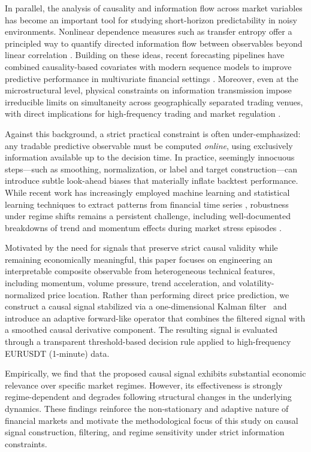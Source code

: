 \documentclass[final,5p,times,twocolumn]{elsarticle}
\begin{document}
In parallel, the analysis of causality and information flow across market variables has become an important tool for studying short-horizon predictability in noisy environments.
Nonlinear dependence measures such as transfer entropy offer a principled way to quantify directed information flow between observables beyond linear correlation \cite{schreiber2000,marschinski2002}.
Building on these ideas, recent forecasting pipelines have combined causality-based covariates with modern sequence models to improve predictive performance in multivariate financial settings \cite{berenguer2024}.
Moreover, even at the microstructural level, physical constraints on information transmission impose irreducible limits on simultaneity across geographically separated trading venues, with direct implications for high-frequency trading and market regulation \cite{Angel2014physicsAndFinancial}.

Against this background, a strict practical constraint is often under-emphasized: any tradable predictive observable must be computed \emph{online}, using exclusively information available up to the decision time.
In practice, seemingly innocuous steps—such as smoothing, normalization, or label and target construction—can introduce subtle look-ahead biases that materially inflate backtest performance.
While recent work has increasingly employed machine learning and statistical learning techniques to extract patterns from financial time series
\cite{zahedi2015,rounaghi2015,roostaee2023,wood2024},
robustness under regime shifts remains a persistent challenge, including well-documented breakdowns of trend and momentum effects during market stress episodes \cite{daniel2016}.

Motivated by the need for signals that preserve strict causal validity while remaining economically meaningful, this paper focuses on engineering an interpretable composite observable from heterogeneous technical features, including momentum, volume pressure, trend acceleration, and volatility-normalized price location.
Rather than performing direct price prediction, we construct a causal signal stabilized via a one-dimensional Kalman filter~\cite{kalman1960} and introduce an adaptive forward-like operator that combines the filtered signal with a smoothed causal derivative component.
The resulting signal is evaluated through a transparent threshold-based decision rule applied to high-frequency EURUSDT (1-minute) data.

Empirically, we find that the proposed causal signal exhibits substantial economic relevance over specific market regimes.
However, its effectiveness is strongly regime-dependent and degrades following structural changes in the underlying dynamics.
These findings reinforce the non-stationary and adaptive nature of financial markets and motivate the methodological focus of this study on causal signal construction, filtering, and regime sensitivity under strict information constraints.
 
\end{document}
